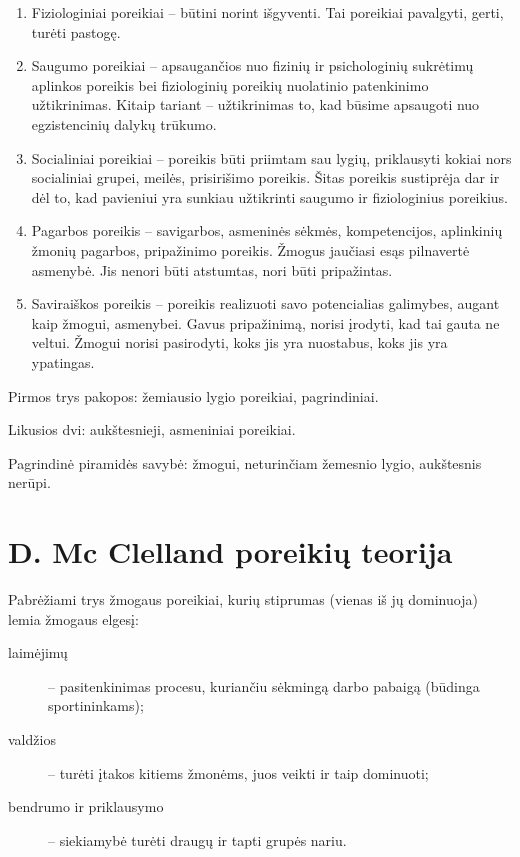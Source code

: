\begin{enumerate}
  \item Fiziologiniai poreikiai – būtini norint išgyventi. Tai poreikiai
    pavalgyti, gerti, turėti pastogę.
  \item Saugumo poreikiai – apsaugančios nuo fizinių ir psichologinių
    sukrėtimų aplinkos poreikis bei fiziologinių poreikių nuolatinio
    patenkinimo užtikrinimas. Kitaip tariant – užtikrinimas to, kad
    būsime apsaugoti nuo egzistencinių dalykų trūkumo.
  \item Socialiniai poreikiai – poreikis būti priimtam sau lygių,
    priklausyti kokiai nors socialiniai grupei, meilės, prisirišimo
    poreikis. Šitas poreikis sustiprėja dar ir dėl to, kad pavieniui
    yra sunkiau užtikrinti saugumo ir fiziologinius poreikius.
  \item Pagarbos poreikis – savigarbos, asmeninės sėkmės, kompetencijos,
    aplinkinių žmonių pagarbos, pripažinimo poreikis. Žmogus jaučiasi
    esąs pilnavertė asmenybė. Jis nenori būti atstumtas, nori būti
    pripažintas.
  \item Saviraiškos poreikis – poreikis realizuoti savo potencialias
    galimybes, augant kaip žmogui, asmenybei. Gavus pripažinimą, norisi
    įrodyti, kad tai gauta ne veltui. Žmogui norisi pasirodyti, koks
    jis yra nuostabus, koks jis yra ypatingas.
\end{enumerate}

Pirmos trys pakopos: žemiausio lygio poreikiai, pagrindiniai.

Likusios dvi: aukštesnieji, asmeniniai poreikiai.

Pagrindinė piramidės savybė: žmogui, neturinčiam žemesnio lygio, aukštesnis
nerūpi.

\section{D. Mc Clelland poreikių teorija}

Pabrėžiami trys žmogaus poreikiai, kurių stiprumas (vienas iš jų dominuoja)
lemia žmogaus elgesį:
\begin{description}
  \item[laimėjimų] – pasitenkinimas procesu, kuriančiu sėkmingą darbo
    pabaigą (būdinga sportininkams);
  \item[valdžios] – turėti įtakos kitiems žmonėms, juos veikti ir
    taip dominuoti;
  \item[bendrumo ir priklausymo] – siekiamybė turėti draugų ir tapti
    grupės nariu.
\end{description}

